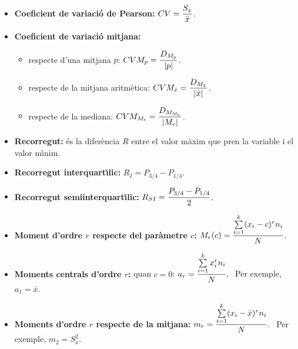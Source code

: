 \begin{itemize}
\begin{itemize}
\item respecte de la mediana: $\displaystyle D_{M_{M_e}} = {\sum\limits_{i=1}^k
| x_i - M_e | n_i \over N}$.

\end{itemize}

\item {\bf Coeficient de variaci\'o de Pearson:} $\displaystyle CV = {S_x
\over \bar{x}}$.

\item {\bf Coeficient de variaci\'o mitjana:}

\begin{itemize}

\item respecte d'una mitjana $p$: $\displaystyle CVM_p = {D_{M_p} \over | p |}$.

\item respecte de la mitjana aritm\`etica: $\displaystyle CVM_{\bar{x}} =
{D_{M_{\bar{x}}} \over | \bar{x} |}$.

\item respecte de la mediana: $\displaystyle CVM_{M_e} = {D_{M_{M_e}} \over |
M_e |}$.

\end{itemize}

\item {\bf Recorregut:} \'es la difer\`encia $R$ entre el 
valor m\`axim que pren la
variable i el valor m\'{\i}nim.

\item {\bf Recorregut interquart\'{\i}lic:} 
$\displaystyle R_I = P_{3/4} - P_{1/4}$.

\item {\bf Recorregut semiinterquart\'{\i}lic:} 
$\displaystyle R_{SI} = {P_{3/4} - P_{1/4} \over 2}$.

\item {\bf Moment d'ordre $r$ respecte del par\`ametre $c$:} 
 $\displaystyle M_r(c) = {\sum\limits_{i=1}^k 
(x_i - c)^r n_i \over N}$.

\item {\bf Moments centrals d'ordre $r$:} 
 quan $c = 0$: $\displaystyle a_r =
{\sum\limits_{i=1}^k x_i^r n_i \over N}. \ $ Per exemple, $a_1 = \bar{x}$.

\item {\bf Moments d'ordre $r$ respecte de la mitjana:} $\displaystyle m_r =
{\sum\limits_{i=1}^k (x_i - \bar{x})^r n_i \over N}. \ $ Per exemple, $m_2 =
S_x^2$.

\end{itemize}


